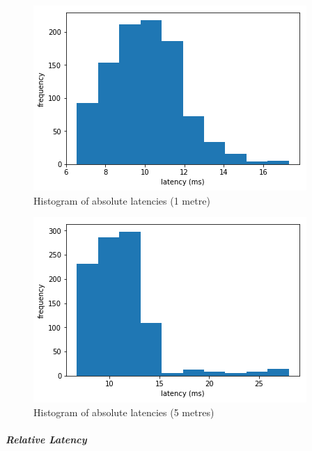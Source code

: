 
\begin{figure}[ht]
  \centering
    \includegraphics[width=\textwidth]{Chapters/Figures/technical/Latency/figure4.png}
    \caption{Histogram of absolute latencies (1 metre)}
    \label{fig:latency_fig4}
\end{figure}


\begin{figure}[ht]
  \centering
    \includegraphics[width=\textwidth]{Chapters/Figures/technical/Latency/figure5.png}
    \caption{Histogram of absolute latencies (5 metres)}
    \label{fig:latency_fig5}
\end{figure}

\subparagraph{Relative Latency}

